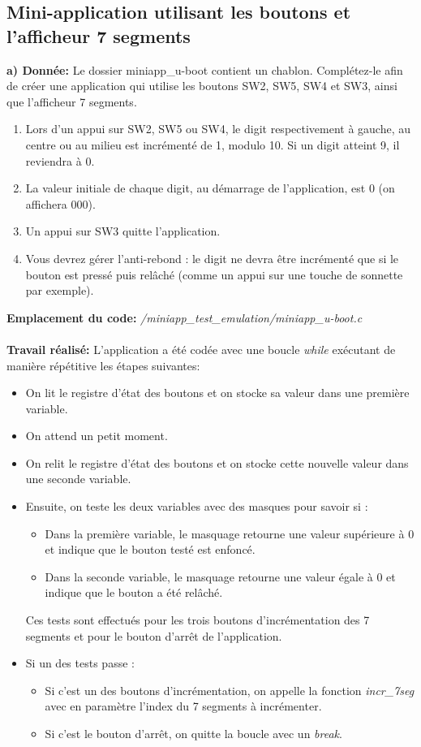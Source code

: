 \subsection{Mini-application utilisant les boutons et l'afficheur 7 segments}
\textbf{a) Donnée: }Le dossier miniapp\_u-boot contient un chablon. Complétez-le afin de créer une application qui
utilise les boutons SW2, SW5, SW4 et SW3, ainsi que l’afficheur 7 segments.
\begin{enumerate}
	\item Lors d’un appui sur SW2, SW5 ou SW4, le digit respectivement à gauche, au centre ou au
	milieu est incrémenté de 1, modulo 10. Si un digit atteint 9, il reviendra à 0. 
	\item La valeur initiale de chaque digit, au démarrage de l’application, est 0 (on affichera 000). 
	\item Un appui sur SW3 quitte l’application. 
	\item Vous devrez gérer l’anti-rebond : le digit ne devra être incrémenté que si le bouton est
	pressé puis relâché (comme un appui sur une touche de sonnette par exemple). \\
\end{enumerate}
\textbf{Emplacement du code: }\textit{/miniapp\_test\_emulation/miniapp\_u-boot.c}\\\\
\textbf{Travail réalisé: }L'application a été codée avec une boucle \textit{while} exécutant de manière répétitive les étapes suivantes:
\begin{itemize}
	\item On lit le registre d'état des boutons et on stocke sa valeur dans une première variable. 
	\item On attend un petit moment.
	\item On relit le registre d'état des boutons et on stocke cette nouvelle valeur dans une seconde variable.
	\item Ensuite, on teste les deux variables avec des masques pour savoir si :
	\begin{itemize}
		\item Dans la première variable, le masquage retourne une valeur supérieure à 0 et indique que le bouton testé est enfoncé.
		\item Dans la seconde variable, le masquage retourne une valeur égale à 0 et indique que le bouton a été relâché. 
	\end{itemize}
	Ces tests sont effectués pour les trois boutons d'incrémentation des 7 segments et pour le bouton d'arrêt de l'application. 
	\item Si un des tests passe :
	\begin{itemize}
		\item Si c'est un des boutons d'incrémentation, on appelle la fonction \textit{incr\_7seg} avec en paramètre l'index du 7 segments à incrémenter.
		\item Si c'est le bouton d'arrêt, on quitte la boucle avec un \textit{break}.\\
	\end{itemize}
\end{itemize}
